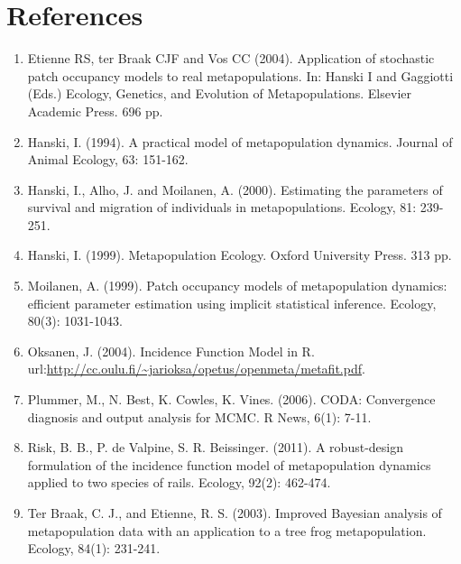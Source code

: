 \documentclass{article}\usepackage[]{graphicx}\usepackage[]{xcolor}
\begin{document}
\section{References}

\begin{enumerate}

\item Etienne RS, ter Braak CJF and Vos CC (2004). Application of stochastic patch occupancy models to real metapopulations. In: Hanski I and Gaggiotti (Eds.) Ecology, Genetics, and Evolution of Metapopulations. Elsevier Academic Press. 696 pp.

\item Hanski, I. (1994). A practical model of metapopulation dynamics. Journal of Animal Ecology, 63: 151-162.

\item Hanski, I., Alho, J. and Moilanen, A. (2000). Estimating the parameters of survival and migration of individuals in metapopulations. Ecology, 81: 239-251.

\item Hanski, I. (1999). Metapopulation Ecology. Oxford University Press. 313 pp.

\item Moilanen, A. (1999). Patch occupancy models of metapopulation dynamics: efficient parameter estimation using implicit statistical inference. Ecology, 80(3): 1031-1043. 

\item Oksanen, J. (2004). Incidence Function Model in R. url:\url{http://cc.oulu.fi/~jarioksa/opetus/openmeta/metafit.pdf}.

\item Plummer, M., N. Best, K. Cowles, K. Vines. (2006). CODA: Convergence diagnosis and output analysis for MCMC. R News, 6(1): 7-11.

\item Risk, B. B., P. de Valpine, S. R. Beissinger. (2011). A robust-design formulation of the incidence function model of metapopulation dynamics applied to two species of rails. Ecology, 92(2): 462-474.

\item Ter Braak, C. J., and Etienne, R. S. (2003). Improved Bayesian analysis of metapopulation data with an application to a tree frog metapopulation. Ecology, 84(1): 231-241. 
\end{enumerate}
\end{document}

